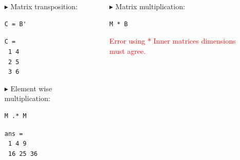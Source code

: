 \documentclass[aspectratio=169]{beamer}
\begin{document}
\begin{frame}[fragile]{}
    \begin{columns}
        \begin{itemize}
            \item[$\blacktriangleright$]
            Matrix transposition:
            \begin{verbatim}
C = B'
            \end{verbatim}
            \texttt{C =} \\
            \texttt{\hspace{3em} 1 \hspace{3em} 4} \\
            \texttt{\hspace{3em} 2 \hspace{3em} 5} \\
            \texttt{\hspace{3em} 3 \hspace{3em} 6}

            \item[$\blacktriangleright$]
            Element wise multiplication:
            \begin{verbatim}
M .* M
            \end{verbatim}
            \texttt{ans =} \\
            \texttt{\hspace{3em} 1  \hspace{3em} 4  \hspace{3em} 9} \\
            \texttt{\hspace{3em} 16 \hspace{3em}25 \hspace{3em} 36}
        \end{itemize}

        \vspace{-10pt}
        \begin{itemize}
            \item[$\blacktriangleright$]
            Matrix multiplication:
            \begin{verbatim}
M * B
            \end{verbatim}
            \textcolor{red}{\small{Error using * Inner matrices dimensions must agree.}} \\


\end{itemize}
\end{columns}
\end{frame}
\end{document}
